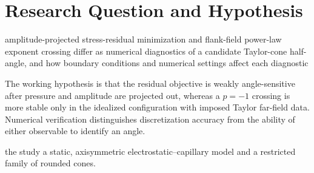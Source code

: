 \section{Research Question and Hypothesis}

 amplitude-projected stress-residual minimization and flank-field power-law exponent crossing differ as numerical diagnostics of a candidate Taylor-cone half-angle, and how boundary conditions and numerical settings affect each diagnostic

The working hypothesis is that the residual objective is weakly angle-sensitive after pressure and amplitude are projected out, whereas a $p=-1$ crossing is more stable only in the idealized configuration with imposed Taylor far-field data. Numerical verification distinguishes discretization accuracy from the ability of either observable to identify an angle.

 the study  a static, axisymmetric electrostatic--capillary model and a restricted family of rounded cones. 
